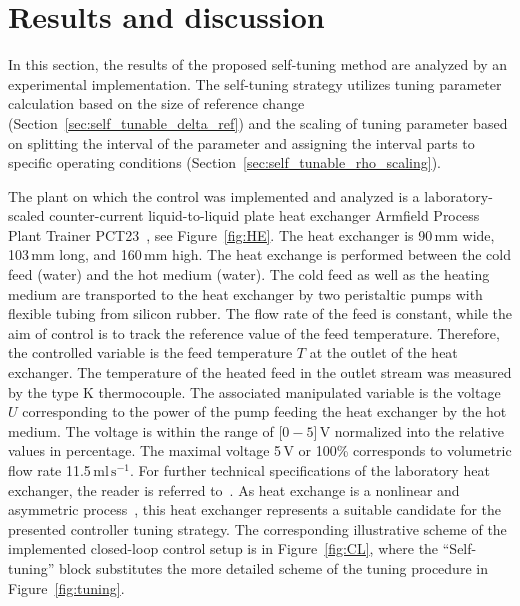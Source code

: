 \documentclass[preprint,12pt]{elsarticle}
\begin{document}
	
	\section{Results and discussion}
	\label{sec:results}
	
	In this section, the results of the proposed self-tuning method are analyzed by an experimental implementation. The self-tuning strategy utilizes tuning parameter calculation based on the size of reference change (Section~\ref{sec:self_tunable_delta_ref}) and the scaling of tuning parameter based on splitting the interval of the parameter and assigning the interval parts to specific operating conditions (Section~\ref{sec:self_tunable_rho_scaling}).

The plant on which the control was implemented and analyzed is a laboratory-scaled counter-current liquid-to-liquid plate heat exchanger Armfield Process Plant Trainer PCT23~\cite{pct23}, see Figure~\ref{fig:HE}. The heat exchanger is 90\,mm wide, 103\,mm long, and 160\,mm high. The heat exchange is performed between the cold feed (water) and the hot medium (water). The cold feed as well as the heating medium are transported to the heat exchanger by two peristaltic pumps with flexible tubing from silicon rubber. The flow rate of the feed is constant, while the aim of control is to track the reference value of the feed temperature. Therefore, the controlled variable is the feed temperature $T$ at the outlet of the heat exchanger. The temperature of the heated feed in the outlet stream was measured by the type K thermocouple. The associated manipulated variable is the voltage $U$ corresponding to the power of the pump feeding the heat exchanger by the hot medium. The voltage is within the range of [$0-5$]\,V normalized into the relative values in percentage. The maximal voltage 5\,V or 100\% corresponds to volumetric flow rate 11.5\,$\mathrm{ml}\,\mathrm{s}^{-1}$. For further technical specifications of the laboratory heat exchanger, the reader is referred to~\cite{pct23}. As heat exchange is a nonlinear and asymmetric process~\cite{Liptak}, this heat exchanger represents a suitable candidate for the presented controller tuning strategy. The corresponding illustrative scheme of the implemented closed-loop control setup is in Figure~\ref{fig:CL}, where the ``Self-tuning'' block substitutes the more detailed scheme of the tuning procedure in Figure~\ref{fig:tuning}.  
\end{document}
